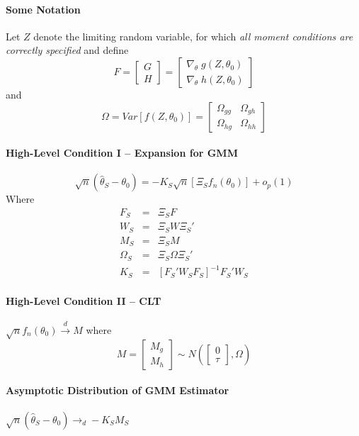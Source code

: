 \documentclass[12pt]{article}
\theoremstyle{definition}
\begin{document}
\paragraph{Some Notation}
	Let $Z$ denote the limiting random variable, for which \emph{all moment conditions are correctly specified} and define
	$$F = \left[\begin{array}
	{c} G \\ H
\end{array} \right] = \left[ \begin{array}
	{c} \nabla_{\theta} \; g(Z,\theta_0) \\ \nabla_{\theta} \; h(Z,\theta_0)
\end{array}\right]$$
and
	$$\Omega = Var\left[ f(Z,\theta_0) \right] = \left[\begin{array}
		{cc}
		\Omega_{gg} & \Omega_{gh}\\
		\Omega_{hg} & \Omega_{hh}
	\end{array} \right]$$


\paragraph{High-Level Condition I -- Expansion for GMM}
$$\sqrt{n}\left(\widehat{\theta}_S - \theta_0\right) = -K_S\sqrt{n}\left[\Xi_S f_n(\theta_0)\right] + o_p(1)$$
Where
	\begin{eqnarray*}
	 	F_S &=& \Xi_S F\\
	 	W_S &=& \Xi_S W\Xi_S'\\
	 	M_S &=& \Xi_S M\\
	 	\Omega_S &=& \Xi_S \Omega\Xi_S'\\
	 	K_S  &=& [F_S'W_SF_S]^{-1} F_S'W_S
	 \end{eqnarray*} 



\paragraph{High-Level Condition II -- CLT} $\sqrt{n}f_n(\theta_0) \overset{d}{\rightarrow}M$ where
	$$M = \left[\begin{array}{c} M_g \\ M_h\end{array} \right] \sim N\left( \left[\begin{array}{c}0\\ \tau \end{array} \right], \Omega \right)$$

\paragraph{Asymptotic Distribution of GMM Estimator} $\sqrt{n}(\widehat{\theta}_S - \theta_0 ) \rightarrow_d-K_S  M_S$
\end{document}
